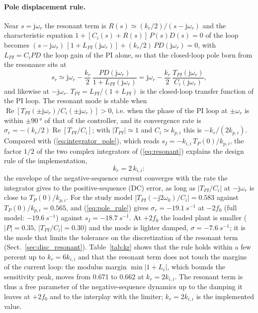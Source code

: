 \documentclass[10pt,a4paper]{scrartcl}
\newcommand{\wo}{\omega_0}
\newcommand{\wres}{\omega_r}
\newcommand{\kpi}{k_{p,i}}
\newcommand{\kii}{k_{i,i}}
\newcommand{\jj}{\mathrm{j}}
\renewcommand{\Re}{\operatorname{Re}}
\begin{document}
\begin{onehalfspace}
\paragraph{Pole displacement rule.} Near $s = \jj\wres$ the resonant term is $R(s) \simeq (k_r/2)/(s - \jj\wres)$ and the characteristic equation $1 + [C_i(s) + R(s)]\,P(s)D(s) = 0$ of the loop becomes $(s - \jj\wres)\,[1 + L_{PI}(\jj\wres)] + (k_r/2)\,P D(\jj\wres) = 0$, with $L_{PI} = C_i P D$ the loop gain of the PI alone, so that the closed-loop pole born from the resonance sits at
\begin{equation}
s_r \simeq \jj\wres - \frac{k_r}{2}\,\frac{P D(\jj\wres)}{1 + L_{PI}(\jj\wres)} = \jj\wres - \frac{k_r}{2}\,\frac{T_{PI}(\jj\wres)}{C_i(\jj\wres)},
\label{eq:pole_rule}
\end{equation}
and likewise at $-\jj\wres$. $T_{PI} = L_{PI}/(1 + L_{PI})$ is the closed-loop transfer function of the PI loop. The resonant mode is stable when $\Re[T_{PI}(\pm\jj\wres)/C_i(\pm\jj\wres)] > 0$, i.e. when the phase of the PI loop at $\pm\wres$ is within $\pm\SI{90}{\degree}$ of that of the controller, and its convergence rate is $\sigma_r = -(k_r/2)\Re[T_{PI}/C_i]$; with $|T_{PI}| \simeq 1$ and $C_i \simeq \kpi$ this is $-k_r/(2\kpi)$. Compared with (\ref{eq:integrator_pole}), which reads $s_I = -\kii\,T_P(0)/\kpi$, the factor $1/2$ of the two complex integrators of (\ref{eq:resonant}) explains the design rule of the implementation,
\begin{equation}
k_r = 2\,\kii :
\label{eq:kr_rule}
\end{equation}
the envelope of the negative-sequence current converges with the rate the integrator gives to the positive-sequence (DC) error, as long as $|T_{PI}/C_i|$ at $-\jj\wres$ is close to $T_P(0)/\kpi$. For the study model $|T_{PI}(-\jj2\wo)/C_i| = 0.583$ against $T_P(0)/\kpi = 0.565$, and (\ref{eq:pole_rule}) gives $\sigma_r = \SI{-19.1}{s^{-1}}$ at $-2f_0$ (full model: $\SI{-19.6}{s^{-1}}$) against $s_I = \SI{-18.7}{s^{-1}}$. At $+2f_0$ the loaded plant is smaller ($|P| = 0.35$, $|T_{PI}/C_i| = 0.30$) and the mode is lighter damped, $\sigma = \SI{-7.6}{s^{-1}}$; it is the mode that limits the tolerance on the discretization of the resonant term (Sect.~\ref{sec:disc_resonant}). Table~\ref{tab:kr} shows that the rule holds within a few percent up to $k_r = 6\kii$ and that the resonant term does not touch the margins of the current loop: the modulus margin $\min|1 + L_i|$, which bounds the sensitivity peak, moves from 0.671 to 0.662 at $k_r = 2\kii$. The resonant term is thus a free parameter of the negative-sequence dynamics up to the damping it leaves at $+2f_0$ and to the interplay with the limiter; $k_r = 2\kii$ is the implemented value.


\end{onehalfspace}
\end{document}
